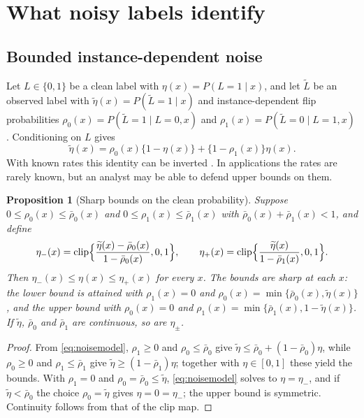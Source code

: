 \documentclass[11pt]{article}
\theoremstyle{plain}
\newtheorem{proposition}{Proposition}
\theoremstyle{definition}
\theoremstyle{remark}
\DeclareMathOperator{\clip}{clip}
\begin{document}
\section{What noisy labels identify}\label{sec:labels}

\subsection{Bounded instance-dependent noise}

Let $L\in\{0,1\}$ be a clean label with $\eta(x)=P(L=1\mid x)$, and let $\widetilde L$ be an
observed label with $\widetilde\eta(x)=P(\widetilde L=1\mid x)$ and instance-dependent flip
probabilities $\rho_0(x)=P(\widetilde L=1\mid L=0,x)$ and $\rho_1(x)=P(\widetilde L=0\mid
L=1,x)$ \citep{frenay2014classification,xia2020part}. Conditioning on $L$ gives
\begin{equation}\label{eq:noisemodel}
\widetilde\eta(x)=\rho_0(x)\{1-\eta(x)\}+\{1-\rho_1(x)\}\eta(x).
\end{equation}
With known rates this identity can be inverted \citep{natarajan2013learning,
menon2015learning}. In applications the rates are rarely known, but an analyst may be able
to defend upper bounds on them.

\begin{proposition}[Sharp bounds on the clean probability]\label{prop:bracket}
Suppose $0\le\rho_0(x)\le\bar\rho_0(x)$ and $0\le\rho_1(x)\le\bar\rho_1(x)$ with
$\bar\rho_0(x)+\bar\rho_1(x)<1$, and define
\begin{equation}\label{eq:bracket}
\eta_-(x)=\clip\Bigl\{\frac{\widetilde\eta(x)-\bar\rho_0(x)}{1-\bar\rho_0(x)},0,1\Bigr\},
\qquad
\eta_+(x)=\clip\Bigl\{\frac{\widetilde\eta(x)}{1-\bar\rho_1(x)},0,1\Bigr\}.
\end{equation}
Then $\eta_-(x)\le\eta(x)\le\eta_+(x)$ for every $x$. The bounds are sharp at each $x$: the
lower bound is attained with $\rho_1(x)=0$ and $\rho_0(x)=\min\{\bar\rho_0(x),
\widetilde\eta(x)\}$, and the upper bound with $\rho_0(x)=0$ and
$\rho_1(x)=\min\{\bar\rho_1(x),1-\widetilde\eta(x)\}$. If $\widetilde\eta$, $\bar\rho_0$ and
$\bar\rho_1$ are continuous, so are $\eta_\pm$.
\end{proposition}

\begin{proof}
From \eqref{eq:noisemodel}, $\rho_1\ge0$ and $\rho_0\le\bar\rho_0$ give
$\widetilde\eta\le\bar\rho_0+(1-\bar\rho_0)\eta$, while $\rho_0\ge0$ and
$\rho_1\le\bar\rho_1$ give $\widetilde\eta\ge(1-\bar\rho_1)\eta$; together with
$\eta\in[0,1]$ these yield the bounds. With $\rho_1=0$ and $\rho_0=\bar\rho_0\le
\widetilde\eta$, \eqref{eq:noisemodel} solves to $\eta=\eta_-$, and if
$\widetilde\eta<\bar\rho_0$ the choice $\rho_0=\widetilde\eta$ gives $\eta=0=\eta_-$; the
upper bound is symmetric. Continuity follows from that of the clip map.
\end{proof}
\end{document}
